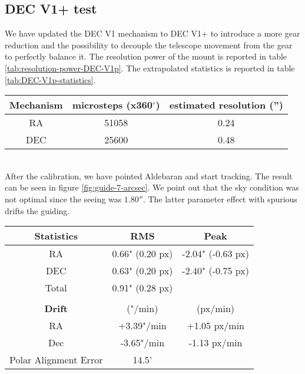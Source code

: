\subsection{DEC V1+ test}
We have updated the DEC V1 mechanism to DEC V1+ to introduce a more gear reduction and the possibility to decouple the telescope movement from the gear to perfectly balance it.
The resolution power of the mount is reported in table \ref{tab:resolution-power-DEC-V1p}.
The extrapolated statistics is reported in table \ref{tab:DEC-V1p-statistics}.
\\
\begin{minipage}
    {.5\textwidth}
    \begin{tabular}{ccc}
        \textbf{Mechanism} & \textbf{microsteps (x360$^{\circ}$)} &\textbf{estimated resolution ('')}\\
        \hline
        RA  & 51058 & 0.24\\ 
        DEC & 25600 & 0.48
    \end{tabular}
    \label{tab:resolution-power-DEC-V1p}
\end{minipage}
\\
After the calibration, we have pointed Aldebaran and start tracking.
The result can be seen in figure \ref{fig:guide-7-arcsec}.
We point out that the sky condition was not optimal since the seeing was \(1.80''\).
The latter parameter effect with spurious drifts the guiding.
\\
\begin{minipage}{.4\textwidth}
    \centering
    \begin{tabular}{ccc}
        \textbf{Statistics}&RMS&Peak\\
        \hline
        RA   & 0.66" (0.20 px) & -2.04" (-0.63 px)  \\
        DEC  & 0.63" (0.20 px) & -2.40" (-0.75 px) \\
        Total& 0.91" (0.28 px) &\\
        \\
        \textbf{Drift}& ("/min) & (px/min)\\
        \hline
        RA& +3.39"/min & +1.05 px/min\\
        Dec& -3.65"/min & -1.13 px/min\\
        Polar Alignment Error&  14.5'&\\
        \hline
    \end{tabular}
    \label{tab:DEC-V1p-statistics}
\end{minipage}